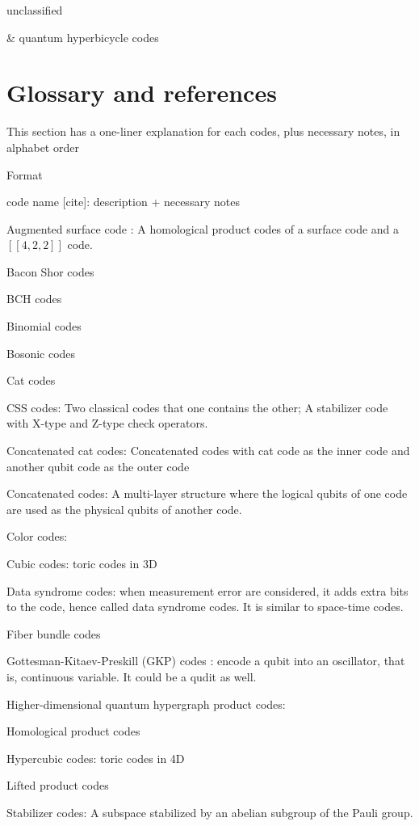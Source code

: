 \documentclass[aps,%
pra, twocolumn,%
notitlepage,longbibliography]{revtex4-2}
\begin{document}
unclassified
\begin{easylist}
  & quantum hyperbicycle codes\cite{kovalev1212quantum}
  
\end{easylist}
  
\section{Glossary and references}
This section has a one-liner explanation for each codes, plus
necessary notes, in alphabet order

Format

code name [cite]: description + necessary notes

Augmented surface code \cite{delfosse2020union}:
A homological product codes of a surface code and a $[[4,2,2]]$ code.

Bacon Shor codes

BCH codes

Binomial codes

Bosonic codes

Cat codes

CSS codes: Two classical codes that one contains the other; A
stabilizer code with X-type and Z-type check operators.

Concatenated cat codes: Concatenated codes with cat code as the inner
code and another qubit code as the outer code

Concatenated codes: A multi-layer structure where the logical qubits
of one code are used as the physical qubits of another code.


Color codes:

Cubic codes: toric codes in 3D

Data syndrome codes: when measurement error are considered, it adds
extra bits to the code, hence called data syndrome codes. It is
similar to space-time codes.

Fiber bundle codes

Gottesman-Kitaev-Preskill (GKP) codes \cite{gottesman2001encoding}: encode a qubit into an
oscillator, that is, continuous variable. It could be a qudit as well.


Higher-dimensional quantum hypergraph product codes:

Homological product codes

Hypercubic codes: toric codes in 4D


Lifted product codes

Stabilizer codes: A subspace stabilized by an abelian subgroup of the
Pauli group.
\end{document}
